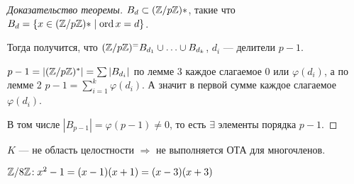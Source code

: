 \begin{proof}[Доказательство теоремы] 
    $B_d \subset (\mathbb{Z} / p\mathbb{Z})*$, такие что $B_d = \{x \in (\mathbb{Z} / p \mathbb{Z})* \mid \operatorname{ord} x = d\}$. 

    Тогда получится, что  $(\mathbb{Z} / p \mathbb{Z})^ = B_{d_1} \cup \ldots \cup B_{d_k}$, $d_i$ --- делители $p - 1$. 

    $p-1 = |(\mathbb{Z} / p \mathbb{Z})^*| = \sum |B_{d_i}|$ по лемме 3  каждое слагаемое  $0$ или  $\varphi(d_i)$, а по лемме 2 $p - 1 = \sum_{i = 1}^k \varphi(d_i)$. А значит в первой сумме каждое слагаемое  $\varphi(d_i)$. 

    В том числе  $|B_{p-1}| = \varphi(p - 1) \neq 0$, то есть  $\exists $ элементы порядка  $p-1$.
\end{proof}
\begin{remark}
    $K$ --- не область целостности  $\Rightarrow$ не выполняется ОТА для многочленов.
    
    $\mathbb{Z} / 8\mathbb{Z}\!: x^2-1 = (x-1)(x+1) = (x-3)(x+3)$
\end{remark}
